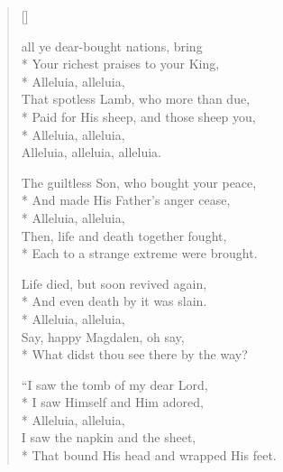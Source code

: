 \newHymn
{}
\label{bring}

\begin{verse}[\versewidth]
\begin{patverse}
 all ye dear-bought nations, bring \\*
Your richest praises to your King,\\*
Alleluia, alleluia,                 \\
That spotless Lamb, who more than due, \\*        
Paid for His sheep, and those sheep you,  \\*     
Alleluia, alleluia,\\ 
Alleluia, alleluia, alleluia.
\end{patverse}

\begin{patverse}
 The guiltless Son, who bought your peace,       \\*                                  
And made His Father's anger cease,\\*
Alleluia, alleluia,                  \\
Then, life and death together fought,   \\*       
Each to a strange extreme were brought.        
\end{patverse}

\begin{patverse}
 Life died, but soon revived again, \\* 
And even death by it was slain.                \\*
Alleluia, alleluia,                            \\
Say, happy Magdalen, oh say,                  \\*
What didst thou see there by the way?      
\end{patverse}

\begin{patverse}
 ``I saw the tomb of my dear Lord,            \\*
I saw Himself and Him adored,                  \\*
Alleluia, alleluia,                            \\
I saw the napkin and the sheet,                \\*
That bound His head and wrapped His feet. 
\end{patverse}


\end{verse}
